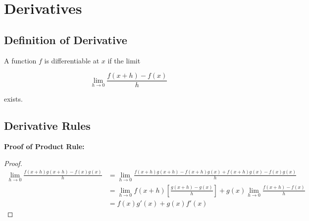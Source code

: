 \section{Derivatives}

    \subsection{Definition of Derivative}

        A function $f$ is differentiable at $x$ if the limit

        \[
            \lim_{h\to 0} \frac{f(x+h)-f(x)}{h}
        \]

        exists.

    \subsection{Derivative Rules}

        \begin{tcolorbox}[colback=red!10]
            \textbf{Proof of Product Rule:}

            \begin{proof}
                \begin{align*}
                    \lim_{h\to 0} \frac{f(x+h)g(x+h)-f(x)g(x)}{h}   &= \lim_{h\to 0} \frac{f(x+h)g(x+h) - f(x+h) g(x) + f(x+h) g(x) - f(x)g(x)}{h} \\
                    &= \lim_{h\to 0} f(x+h) \left[\frac{g(x+h)-g(x)}{h}\right] + g(x) \lim_{h\to 0} \frac{f(x+h) - f(x)}{h} \\
                    &= f(x)g'(x) + g(x)f'(x)
                \end{align*}
            \end{proof}
        \end{tcolorbox}